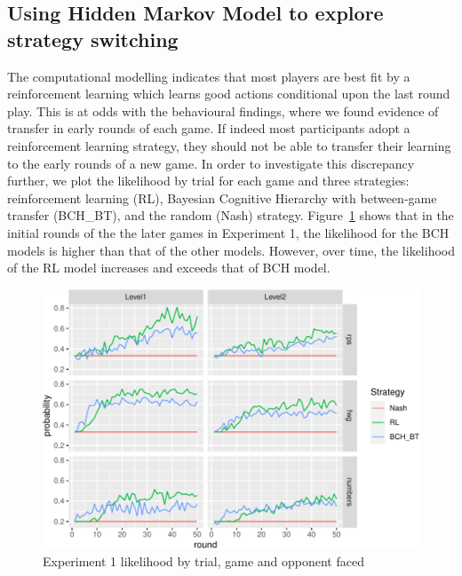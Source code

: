 \documentclass[
  english,
  man,floatsintext]{apa6}
\begin{document}
\hypertarget{using-hidden-markov-model-to-explore-strategy-switching}{%
\subsection{Using Hidden Markov Model to explore strategy switching}\label{using-hidden-markov-model-to-explore-strategy-switching}}

The computational modelling indicates that most players are best fit by a reinforcement learning which learns good actions conditional upon the last round play. This is at odds with the behavioural findings, where we found evidence of transfer in early rounds of each game. If indeed most participants adopt a reinforcement learning strategy, they should not be able to transfer their learning to the early rounds of a new game. In order to investigate this discrepancy further, we plot the likelihood by trial for each game and three strategies: reinforcement learning (RL), Bayesian Cognitive Hierarchy with between-game transfer (BCH\_BT), and the random (Nash) strategy. Figure~\ref{fig:exp1-lik-by-tr} shows that in the initial rounds of the the later games in Experiment 1, the likelihood for the BCH models is higher than that of the other models. However, over time, the likelihood of the RL model increases and exceeds that of BCH model.

\begin{figure}

{\centering \includegraphics{paper_draft_2021_files/figure-latex/exp1-lik-by-tr-1} 

}

\caption{Experiment 1 likelihood by trial, game and opponent faced}\label{fig:exp1-lik-by-tr}
\end{figure}
\end{document}
